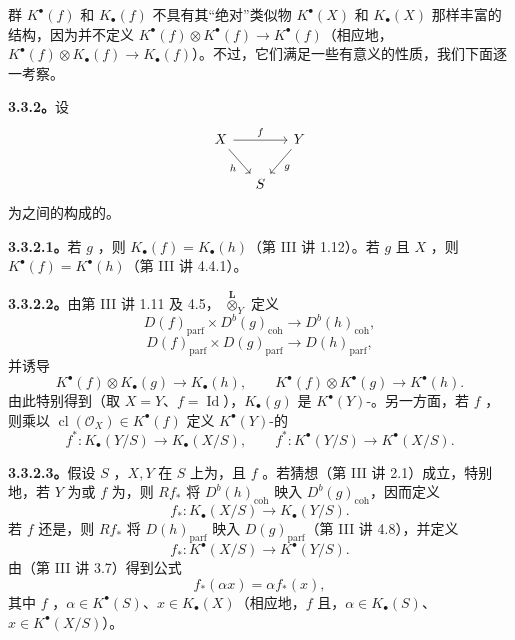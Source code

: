 群 $K^\bullet(f)$ 和 $K_\bullet(f)$ 不具有其“绝对”类似物 $K^\bullet(X)$ 和 $K_\bullet(X)$ 那样丰富的结构，因为并不定义 $K^\bullet(f)\otimes K^\bullet(f)\to K^\bullet(f)$（相应地，$K^\bullet(f)\otimes K_\bullet(f)\to K_\bullet(f)$）。不过，它们满足一些有意义的性质，我们下面逐一考察。

\textbf{3.3.2。}设
\[\begin{tikzcd}[column sep=small]
X\arrow[rr,"f"]\arrow[dr,"h"']&&Y\arrow[dl,"g"]\\
&S&
\end{tikzcd}\]
为之间的构成的。

\textbf{3.3.2.1。}若 $g$ ，则 $K_\bullet(f)=K_\bullet(h)$（第 III 讲 1.12）。若 $g$ 且 $X$ ，则 $K^\bullet(f)=K^\bullet(h)$（第 III 讲 4.4.1）。

\textbf{3.3.2.2。}由第 III 讲 1.11 及 4.5， $\mathbin{\overset{\mathbf L}{\otimes}}_Y$ 定义
\[D(f)_{\mathrm{parf}}\times D^b(g)_{\mathrm{coh}}\longrightarrow D^b(h)_{\mathrm{coh}},\]
\[D(f)_{\mathrm{parf}}\times D(g)_{\mathrm{parf}}\longrightarrow D(h)_{\mathrm{parf}},\]
并诱导
\[K^\bullet(f)\otimes K_\bullet(g)\longrightarrow K_\bullet(h),\qquad K^\bullet(f)\otimes K^\bullet(g)\longrightarrow K^\bullet(h).\]
由此特别得到（取 $X=Y$、$f=\operatorname{Id}$），$K_\bullet(g)$ 是 $K^\bullet(Y)$-。另一方面，若 $f$ ，则乘以 $\operatorname{cl}(\mathscr O_X)\in K^\bullet(f)$ 定义 $K^\bullet(Y)$-的
\[f^*:K_\bullet(Y/S)\longrightarrow K_\bullet(X/S),\qquad f^*:K^\bullet(Y/S)\longrightarrow K^\bullet(X/S).\]

\textbf{3.3.2.3。}假设 $S$ ，$X,Y$ 在 $S$ 上为，且 $f$ 。若猜想（第 III 讲 2.1）成立，特别地，若 $Y$ 为或 $f$ 为，则 $Rf_*$ 将 $D^b(h)_{\mathrm{coh}}$ 映入 $D^b(g)_{\mathrm{coh}}$，因而定义
\[f_*:K_\bullet(X/S)\longrightarrow K_\bullet(Y/S).\]
若 $f$ 还是，则 $Rf_*$ 将 $D(h)_{\mathrm{parf}}$ 映入 $D(g)_{\mathrm{parf}}$（第 III 讲 4.8），并定义
\[f_*:K^\bullet(X/S)\longrightarrow K^\bullet(Y/S).\]
由（第 III 讲 3.7）得到公式
\[f_*(\alpha x)=\alpha f_*(x),\]
其中 $f$ ，$\alpha\in K^\bullet(S)$、$x\in K_\bullet(X)$（相应地，$f$ 且，$\alpha\in K_\bullet(S)$、$x\in K^\bullet(X/S)$）。

